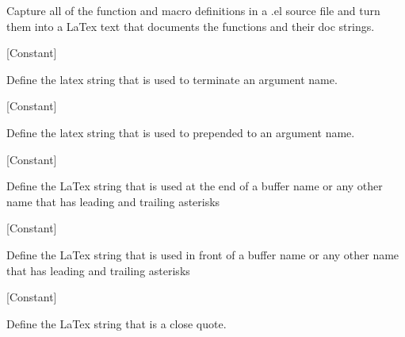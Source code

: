 \begin{doc-string}
Capture all of the function and macro definitions in a .el source file and turn
them into a LaTex text that documents the functions and their doc strings.
\end{doc-string}

\vspace{1em}
\noindent
{}
\usebox{\funcname}
 \hfill [Constant]

\begin{doc-string}
Define the latex string that is used to terminate an argument name.
\end{doc-string}

\vspace{1em}
\noindent
{}
\usebox{\funcname}
 \hfill [Constant]

\begin{doc-string}
Define the latex string that is used to prepended to an argument name.
\end{doc-string}

\vspace{1em}
\noindent
{}
\usebox{\funcname}
 \hfill [Constant]

\begin{doc-string}
Define the LaTex string that is used at the end of a buffer name or
any other name that has leading and trailing asterisks
\end{doc-string}

\vspace{1em}
\noindent
{}
\usebox{\funcname}
 \hfill [Constant]

\begin{doc-string}
Define the LaTex string that is used in front of a buffer name or
any other name that has leading and trailing asterisks
\end{doc-string}

\vspace{1em}
\noindent
{}
\usebox{\funcname}
 \hfill [Constant]

\begin{doc-string}
Define the LaTex string that is a close quote.
\end{doc-string}

